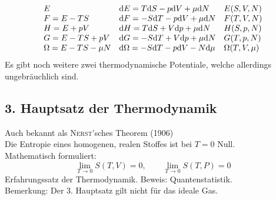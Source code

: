 \begin{equation}
    \begin{array}{lll}
E & \mathrm{d} E = T \mathrm{d} S - p \mathrm{d} V + \mu \mathrm{d} N & E(S, V, N) \\
F = E - TS & \mathrm{d} F = - S \mathrm{d} T - p \mathrm{d} V + \mu \mathrm{d} N & F(T, V, N) \\
H = E + pV & \mathrm{d} H = T \mathrm{d} S + V \mathrm{d} p + \mu \mathrm{d} N & H(S, p, N) \\
G = E - TS + pV & \mathrm{d} G = - S \mathrm{d} T + V \mathrm{d} p + \mu \mathrm{d} N & G(T, p, N) \\
\Omega = E - TS - \mu N & \mathrm{d} \Omega = - S \mathrm{d} T - p \mathrm{d} V - N \mathrm{d} \mu & \Omega(T, V, \mu)
\end{array}
\end{equation}
Es gibt noch weitere zwei thermodynamische Potentiale, welche allerdings ungebräuchlich sind.

\subsection{3. Hauptsatz der Thermodynamik}
Auch bekannt als \textsc{Nerst}'sches Theorem (1906) \\
Die Entropie eines homogenen, realen Stoffes ist bei $T=0$ Null. \\
Mathematisch formuliert:
\begin{equation}
    \lim_{T \to 0} S(T, V) = 0, \qquad \lim_{T \to 0} S(T, P) = 0
\end{equation}
Erfahrungssatz der Thermodynamik. Beweis: Quantenstatistik. \\[\baselineskip]
Bemerkung: Der 3. Hauptsatz gilt nicht für das ideale Gas.
